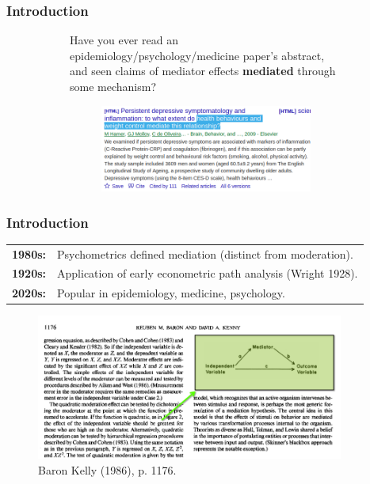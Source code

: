 \documentclass[dvipsnames,handout]{beamer} %
\begin{document}
\begin{frame}[noframenumbering]
    \frametitle{Introduction}
    \begin{figure}[h!]
        \centering
        \singlespacing
        \begin{subfigure}[c]{\textwidth}
            Have you ever read an epidemiology/psychology/medicine paper's abstract, and seen claims of mediator effects \textbf{mediated} through some mechanism?
        \end{subfigure}
        \begin{subfigure}[c]{0.75\textwidth}
            \centering
            \singlespacing
            \begin{subfigure}[c]{\textwidth}
                \centering
                \includegraphics[width=\textwidth]{presentation-files/headlines/hamer-2009.png}
            \end{subfigure}
        \end{subfigure}
    \end{figure}
\end{frame}
\begin{frame}[noframenumbering]
    \frametitle{Introduction}
    \begin{tabular}{l l}
        \textbf{1980s:}
        & Psychometrics defined mediation (distinct from moderation). \\
        \textbf{1920s:} 
        & Application of early econometric path analysis (Wright 1928). \\
        \textbf{2020s:}
        & Popular in epidemiology, medicine, psychology.
    \end{tabular}
    \vskip-0.5cm
    \begin{figure}
        \centering
        \singlespacing
        \caption{Baron Kelly (1986), p. 1176.}
        \vskip-0.25cm
        \includegraphics[width=0.9\textwidth]{presentation-files/headlines/baronkelly-1986.png}
    \end{figure}
\end{frame}%
\end{document}
